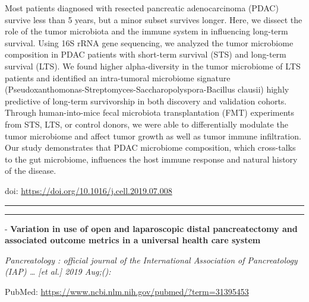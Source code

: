 \documentclass[]{article}
\begin{document}
Most patients diagnosed with resected pancreatic adenocarcinoma (PDAC)
survive less than 5 years, but a minor subset survives longer. Here, we
dissect the role of the tumor microbiota and the immune system in
influencing long-term survival. Using 16S rRNA gene sequencing, we
analyzed the tumor microbiome composition in PDAC patients with
short-term survival (STS) and long-term survival (LTS). We found higher
alpha-diversity in the tumor microbiome of LTS patients and identified
an intra-tumoral microbiome signature
(Pseudoxanthomonas-Streptomyces-Saccharopolyspora-Bacillus clausii)
highly predictive of long-term survivorship in both discovery and
validation cohorts. Through human-into-mice fecal microbiota
transplantation (FMT) experiments from STS, LTS, or control donors, we
were able to differentially modulate the tumor microbiome and affect
tumor growth as well as tumor immune infiltration. Our study
demonstrates that PDAC microbiome composition, which cross-talks to the
gut microbiome, influences the host immune response and natural history
of the disease.

doi: \url{https://doi.org/10.1016/j.cell.2019.07.008}

{}

{}

\begin{center}\rule{0.5\linewidth}{\linethickness}\end{center}

\begin{center}\rule{0.5\linewidth}{\linethickness}\end{center}

 - \textbf{Variation in use of open and laparoscopic distal
pancreatectomy and associated outcome metrics in a universal health care
system}

\emph{Pancreatology : official journal of the International Association
of Pancreatology (IAP) \ldots{} {[}et al.{]} 2019 Aug;():}

PubMed: \url{https://www.ncbi.nlm.nih.gov/pubmed/?term=31395453}
\end{document}
